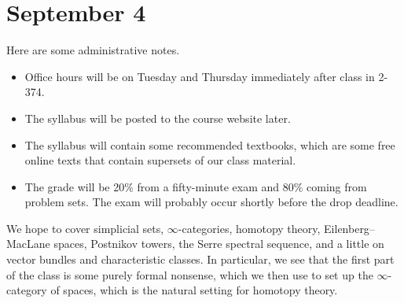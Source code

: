 \documentclass[../notes.tex]{subfiles}
\begin{document}
\section{September 4}
Here are some administrative notes.
\begin{itemize}
	\item Office hours will be on Tuesday and Thursday immediately after class in 2-374.
	\item The syllabus will be posted to the course website later.
	\item The syllabus will contain some recommended textbooks, which are some free online texts that contain supersets of our class material.
	\item The grade will be 20\% from a fifty-minute exam and 80\% coming from problem sets. The exam will probably occur shortly before the drop deadline.
\end{itemize}
We hope to cover simplicial sets, $\infty$-categories, homotopy theory, Eilenberg--MacLane spaces, Postnikov towers, the Serre spectral sequence, and a little on vector bundles and characteristic classes. In particular, we see that the first part of the class is some purely formal nonsense, which we then use to set up the $\infty$-category of spaces, which is the natural setting for homotopy theory.
\end{document}
